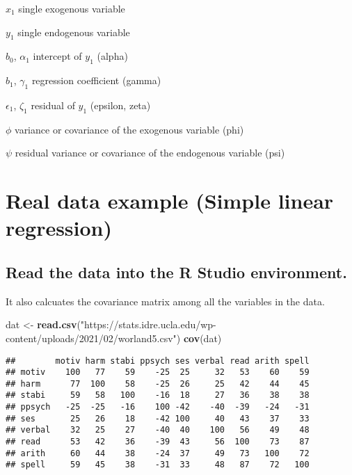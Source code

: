 \documentclass[]{book}
\newenvironment{Shaded}{\begin{snugshade}}{\end{snugshade}}
\newcommand{\KeywordTok}[1]{\textcolor[rgb]{0.13,0.29,0.53}{\textbf{#1}}}
\newcommand{\NormalTok}[1]{#1}
\newcommand{\StringTok}[1]{\textcolor[rgb]{0.31,0.60,0.02}{#1}}
\begin{document}
\(x_{1}\) single exogenous variable

\(y_{1}\) single endogenous variable

\(b_{0}\), \(\alpha_{1}\) intercept of \(y_{1}\) (alpha)

\(b_{1}\), \(\gamma_{1}\) regression coefficient (gamma)

\(\epsilon_{1}\), \(\zeta_{1}\) residual of \(y_{1}\) (epsilon, zeta)

\(\phi\) variance or covariance of the exogenous variable (phi)

\(\psi\) residual variance or covariance of the endogenous variable (psi)

\hypertarget{real-data-example-simple-linear-regression}{%
\chapter{Real data example (Simple linear regression)}\label{real-data-example-simple-linear-regression}}

\hypertarget{read-the-data-into-the-r-studio-environment.}{%
\section{Read the data into the R Studio environment.}\label{read-the-data-into-the-r-studio-environment.}}

It also calcuates the covariance matrix among all the variables in the data.

\begin{Shaded}
\begin{Highlighting}[]
\NormalTok{dat <-}\StringTok{ }\KeywordTok{read.csv}\NormalTok{(}\StringTok{"https://stats.idre.ucla.edu/wp-content/uploads/2021/02/worland5.csv"}\NormalTok{)}
\KeywordTok{cov}\NormalTok{(dat)}
\end{Highlighting}
\end{Shaded}

\begin{verbatim}
##        motiv harm stabi ppsych ses verbal read arith spell
## motiv    100   77    59    -25  25     32   53    60    59
## harm      77  100    58    -25  26     25   42    44    45
## stabi     59   58   100    -16  18     27   36    38    38
## ppsych   -25  -25   -16    100 -42    -40  -39   -24   -31
## ses       25   26    18    -42 100     40   43    37    33
## verbal    32   25    27    -40  40    100   56    49    48
## read      53   42    36    -39  43     56  100    73    87
## arith     60   44    38    -24  37     49   73   100    72
## spell     59   45    38    -31  33     48   87    72   100
\end{verbatim}
\end{document}
